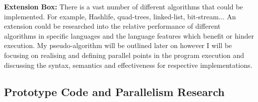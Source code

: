 \documentclass[11pt]{article} %
\begin{document}
\begin{mdframed}
{\bf Extension Box:} There is a vast number of different algorithms that could be implemented. For example, Hashlife, quad-trees, linked-list, bit-stream... An extension could be researched into the relative performance of different algorithms in specific languages and the language features which benefit or hinder execution. My pseudo-algorithm will be outlined later on however I will be focusing on realising and defining parallel points in the program execution and discussing the syntax, semantics and effectiveness for respective implementations. 
\end{mdframed} 
\subsection{Prototype Code and Parallelism Research}
\end{document}

